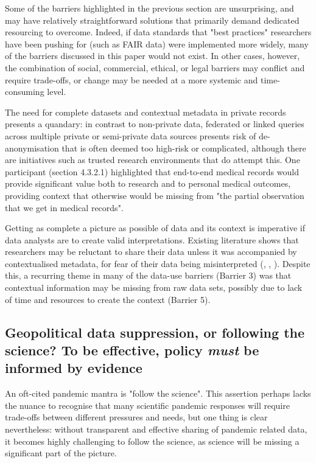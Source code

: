\documentclass{CUP-JNL-DAP}%
\begin{document}
Some of the barriers highlighted in the previous section are unsurprising, and may have relatively straightforward solutions that primarily demand dedicated resourcing to overcome. Indeed, if data standards that "best practices" researchers have been pushing for (such as FAIR data) were implemented more widely, many of the barriers discussed in this paper would not exist. In other cases, however, the combination of social, commercial, ethical, or legal barriers may conflict and require trade-offs, or change may be needed at a more systemic and time-consuming level. 

The need for complete datasets and contextual metadata in private records presents a quandary: in contrast to non-private data, federated or linked queries across multiple private or semi-private data sources presents risk of de-anonymisation that is often deemed too high-risk or complicated, although there are initiatives such as trusted research environments that do attempt this. One participant (section 4.3.2.1) highlighted that end-to-end medical records would provide significant value both to research and to personal medical outcomes, providing context that otherwise would be missing from "the partial observation that we get in medical records".

Getting as complete a picture as possible of data and its context is imperative if data analysts are to create valid interpretations. Existing literature shows that researchers may be reluctant to share their data unless it was accompanied by contextualised metadata, for fear of their data being misinterpreted  (\cite{datasharing_rcts}, \cite{Yimei_Zhu_Open_access_in_uk}, \cite{empirical_datasharing_plos}). Despite this, a recurring theme in many of the data-use barriers (Barrier 3) was that contextual information may be missing from raw data sets, possibly due to lack of time and resources to create the context (Barrier 5). 

\subsection{Geopolitical data suppression, or following the science? To be effective, policy \textit{must} be informed by evidence}

An oft-cited pandemic mantra is "follow the science". This assertion perhaps lacks the nuance to recognise that many scientific pandemic responses will require trade-offs between different pressures and needs, but one thing is clear nevertheless: without transparent and effective sharing of pandemic related data, it becomes highly challenging to follow the science, as science will be missing a significant part of the picture. 
\end{document}
